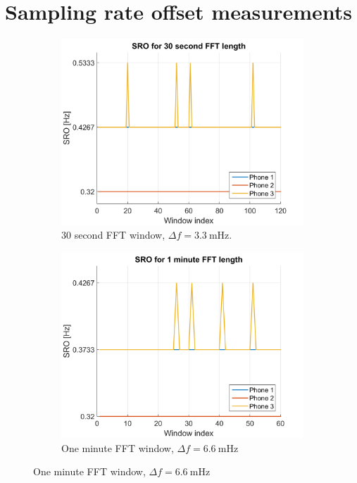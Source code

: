 \documentclass[a4paper, notitlepage]{report}
\begin{document}
\section{Sampling rate offset measurements}
\begin{figure}[H]
\begin{adjustwidth}{-1in}{-1in}
\centering
	\begin{subfigure}{0.5\textwidth}
		\includegraphics[width=\textwidth]{figures/sro-measurement/sro-30sec}
		\caption{30 second FFT window, $\Delta f=3.3~\mathrm{mHz}$.}
		\label{app:sro_30sec}
	\end{subfigure}
	\begin{subfigure}{0.5\textwidth}
		\includegraphics[width=\textwidth]{figures/sro-measurement/sro-1min}
		\caption{One minute FFT window, $\Delta f=6.6~\mathrm{mHz}$}
		\label{app:sro_1min}
	\end{subfigure}
	

\end{adjustwidth}
\end{figure}
\end{document}
